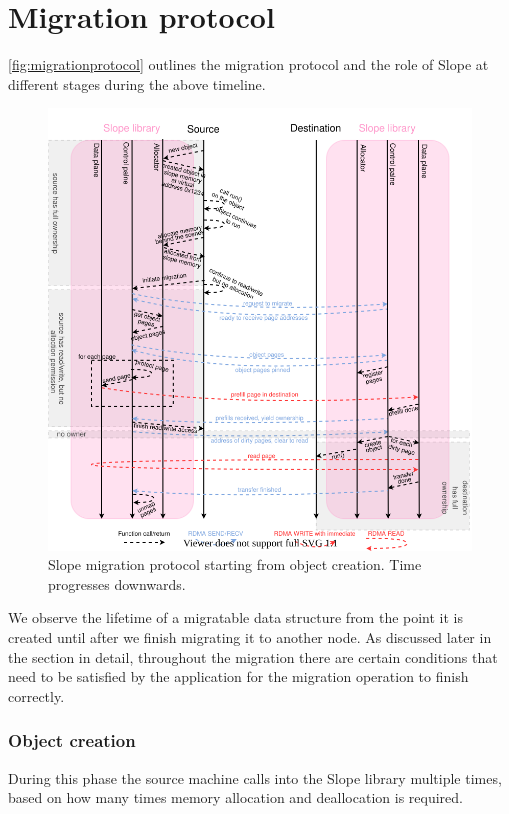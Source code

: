 \section{Migration protocol}
\label{sec:migrationprotocol}

\autoref{fig:migrationprotocol} outlines the migration protocol and the role
of Slope at different stages during the above timeline.

\begin{figure}[tp]
\centering

\includegraphics[width=1\textwidth]{migration-protocol.drawio}
\caption{
    Slope migration protocol starting from object creation. Time progresses
    downwards.
}
\label{fig:migrationprotocol}
\end{figure}

We observe the lifetime of a migratable data structure from the point it is
created until after we finish migrating it to another node. As discussed
later in the section in detail, throughout the migration
there are certain conditions that need to be satisfied by the application
for the migration operation to finish correctly.

\subsubsection{Object creation}
During this phase the source machine calls into the Slope library multiple
times, based on how many times memory allocation and deallocation is required.

